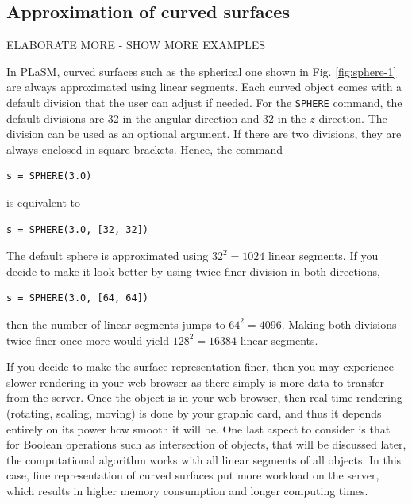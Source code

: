 \subsection{Approximation of curved surfaces} \label{subsec:curved}

ELABORATE MORE - SHOW MORE EXAMPLES

In PLaSM, curved surfaces such as the spherical one shown in Fig. \ref{fig:sphere-1}
are always approximated using linear segments. Each curved object comes
with a default division that the user can adjust if needed. For the 
{\tt SPHERE} command, the default divisions are 32 in the angular direction 
and 32 in the $z$-direction. The division can be used as an optional argument.
If there are two divisions, they are always enclosed in square brackets. Hence, 
the command\\

\begin{bbox}
\begin{verbatim}
s = SPHERE(3.0)
\end{verbatim}
\end{bbox}
\vspace{6mm}

\noindent
is equivalent to \\

\begin{bbox}
\begin{verbatim}
s = SPHERE(3.0, [32, 32])
\end{verbatim}
\end{bbox}
\vspace{6mm}

\noindent
The default sphere is approximated using $32^2 = 1024$ linear
segments. If you decide to make it look better by using 
twice finer division in both directions,\\

\begin{bbox}
\begin{verbatim}
s = SPHERE(3.0, [64, 64])
\end{verbatim}
\end{bbox}
\vspace{6mm}

\noindent
then the number of linear segments jumps to $64^2 = 4096$. Making 
both divisions twice finer once more would yield $128^2 = 16384$ linear
segments. 

If you decide to make the surface representation finer, then you may experience 
slower rendering in your web browser as there simply is more data 
to transfer from the server. Once the object is in your web browser,
then real-time rendering (rotating, scaling, moving) is done by your 
graphic card, and thus it depends entirely on its power how smooth
it will be. One last aspect to consider is that for Boolean operations 
such as intersection of objects, that will be discussed later, the 
computational algorithm works with all linear segments of all objects. 
In this case, fine representation of curved surfaces put more workload 
on the server, which results in higher memory consumption and longer 
computing times. 

